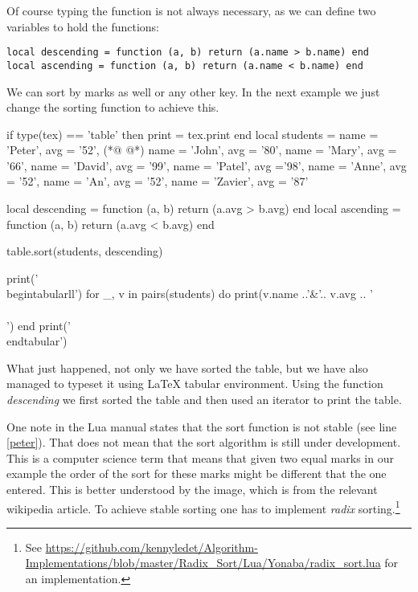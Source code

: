 Of course typing the function is not always necessary, as we can define two variables to hold the functions:

\begin{scriptexample}{}{}
\begin{verbatim}
local descending = function (a, b) return (a.name > b.name) end
local ascending = function (a, b) return (a.name < b.name) end
\end{verbatim}
\end{scriptexample}

We can sort by marks as well or any other key. In the next example we just change the sorting function to achieve this.

\begin{scriptexample}{}{}
\begin{teX}
\begin{luacode}
if type(tex) == 'table' then print = tex.print end
local students = {
  {name = 'Peter', avg = '52'},  (*@\label{peter}  @*)
  {name = 'John', avg = '80'},
  {name = 'Mary', avg = '66'},
  {name = 'David', avg = '99'}, 
  {name = 'Patel', avg ='98'},
  {name = 'Anne', avg = '52'},
  {name = 'An', avg = '52'},
  {name = 'Zavier', avg = '87'} 
}

local descending = function (a, b) return (a.avg > b.avg) end
local ascending = function (a, b) return (a.avg < b.avg) end

table.sort(students, descending)   

print('\\begin{tabular}{ll}')
for _, v in pairs(students) do
   print(v.name ..'&'..  v.avg .. '\\\\')
end
print('\\end{tabular}')
\end{luacode}
\end{teX}
\end{scriptexample}

What just happened, not only we have sorted the table, but we have also managed to typeset it using LaTeX tabular environment. Using the function \emph{descending} we first sorted the table and then used an iterator to print the table.

One note in the Lua manual states that the sort function is not stable (see line \ref{peter}). That does not mean that the sort algorithm is still under development. This is a computer science term that means that given two equal marks in our example the order of the sort for these marks might be different that the one entered. This is better understood by the image, which is from the relevant wikipedia article. To achieve stable sorting one has to implement \emph{radix} sorting.\footnote{See \url{https://github.com/kennyledet/Algorithm-Implementations/blob/master/Radix_Sort/Lua/Yonaba/radix_sort.lua} for an implementation.}

